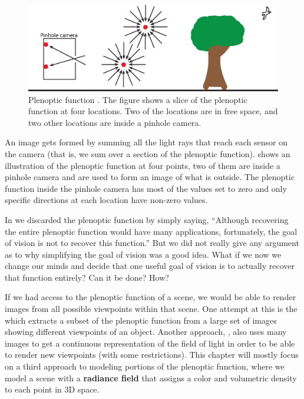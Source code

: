 \begin{figure}[t]
    \centerline{
    \includegraphics[width=1\linewidth]{figures/nerfs/plenoptic_function.eps}
    }
    \caption{Plenoptic function \cite{Adelson91}. 
    The figure shows a slice of the plenoptic function at four locations. Two of the locations are in free space, and two other locations are inside a pinhole camera.}
    \label{fig:nerfs:plenoptic_function}
\end{figure}


An image gets formed by summing all the light rays that reach each sensor on the camera (that is, we sum over a section of the plenoptic function).  \Fig{\ref{fig:nerfs:plenoptic_function}} shows an illustration of the plenoptic function at four points, two of them are inside a pinhole camera and are used to form an image of what is outside. The plenoptic function inside the pinhole camera has most of the values set to zero and only specific directions at each location have non-zero values. 

In \chap{\ref{chap:challenge_of_vision}} we discarded the plenoptic function by simply saying, ``Although recovering the entire plenoptic function would have many applications, fortunately, the goal of vision is not to recover this function.'' But we did not really give any argument as to why simplifying the goal of vision was a good idea. What if we now we change our minds and decide that one useful goal of vision is to actually recover that function entirely? Can it be done? How?

If we had access to the plenoptic function of a scene, we would be able to render images from all possible viewpoints within that scene. One attempt at this is the  \cite{Gortler1996} which extracts a subset of the plenoptic function from a large set of images showing different viewpoints of an object. Another approach,  \cite{Levoy1996}, also uses many images to get a continuous representation of the field of light in order to be able to render new viewpoints (with some restrictions). This chapter will mostly focus on a third approach to modeling portions of the plenoptic function, where we model a scene with a \textbf{radiance field} that assigns a color and volumetric density to each point in 3D space.

